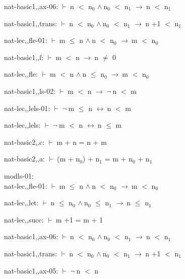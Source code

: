 \documentclass[a4paper]{article}
\newcommand{\Fol}{\mbox{$\vdash\ $}}
\newcommand{\Not}{\mbox{$\neg\ $}}
\newcommand{\And}{\mbox{$\wedge\ $}}
\newcommand{\Imp}{\mbox{$\rightarrow\ $}}
\newcommand{\Equiv}{\mbox{$\leftrightarrow\ $}}
\begin{document}
nat-basic1,,ax-06: 
 \Fol n $<$ $\mbox{n}_{0}$ \And $\mbox{n}_{0}$ $<$ $\mbox{n}_{1}$ \Imp n $<$ $\mbox{n}_{1}$



nat-basic1,,trans: 
 \Fol n $<$ $\mbox{n}_{0}$ \And $\mbox{n}_{0}$ $<$ $\mbox{n}_{1}$ \Imp n +1 $<$ $\mbox{n}_{1}$



nat-lec,,fle-01: 
 \Fol m $\le$ n \And n $<$ $\mbox{n}_{0}$ \Imp m $<$ $\mbox{n}_{0}$



nat-basic1,,f: 
 \Fol m $<$ n \Imp n $\neq$ 0



nat-lec,,fle: 
 \Fol m $<$ n \And n $\le$ $\mbox{n}_{0}$ \Imp m $<$ $\mbox{n}_{0}$



nat-basic1,,ls-02: 
 \Fol m $<$ n \Imp \Not n $<$ m



nat-lec,,lels-01: 
 \Fol \Not m $\le$ n \Equiv n $<$ m



nat-lec,,lels: 
 \Fol \Not m $<$ n \Equiv n $\le$ m



nat-basic2,,c: 
 \Fol m + n = n + m



nat-basic2,,a: 
 \Fol (m + $\mbox{n}_{0}$) + $\mbox{n}_{1}$ = m + $\mbox{n}_{0}$ + $\mbox{n}_{1}$



\bigskip

modls-01:\\ nat-lec,,fle-01: 
 \Fol m $\le$ n \And n $<$ $\mbox{n}_{0}$ \Imp m $<$ $\mbox{n}_{0}$

nat-lec,,let: 
 \Fol n $\le$ $\mbox{n}_{0}$ \And $\mbox{n}_{0}$ $\le$ $\mbox{n}_{1}$ \Imp n $\le$ $\mbox{n}_{1}$



nat-lec,,succ: 
 \Fol m +1 = m + 1



nat-basic1,,ax-06: 
 \Fol n $<$ $\mbox{n}_{0}$ \And $\mbox{n}_{0}$ $<$ $\mbox{n}_{1}$ \Imp n $<$ $\mbox{n}_{1}$



nat-basic1,,trans: 
 \Fol n $<$ $\mbox{n}_{0}$ \And $\mbox{n}_{0}$ $<$ $\mbox{n}_{1}$ \Imp n +1 $<$ $\mbox{n}_{1}$



nat-basic1,,ax-05: 
 \Fol \Not n $<$ n
\end{document}
